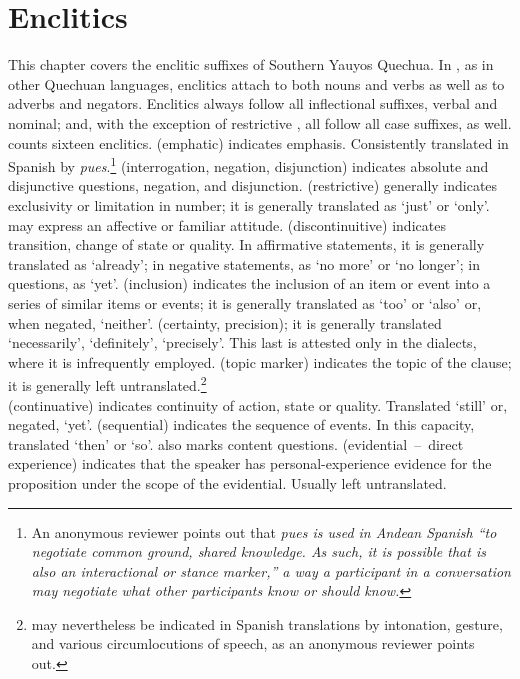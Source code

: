 \chapter{Enclitics}\label{ch:enclitics}
This chapter covers the enclitic suffixes of Southern Yauyos Quechua. In \SYQ, as in other Quechuan languages, enclitics attach to both nouns and verbs as well as to adverbs and negators. Enclitics always follow all inflectional suffixes, verbal and nominal; and, with the exception of restrictive , all follow all case suffixes, as well. \SYQ{} counts sixteen enclitics.  (emphatic) indicates emphasis. Consistently translated in Spanish by \textit{pues}.\footnote{An anonymous reviewer points out that \it{pues} is used in Andean Spanish “to negotiate common ground, shared knowledge. As such, it is possible that  is also an interactional or stance marker,” a way a participant in a conversation may negotiate what other participants know or should know.}  (interrogation, negation, disjunction) indicates absolute and disjunctive questions, negation, and disjunction.  (restrictive) generally indicates exclusivity or limitation in number; it is generally translated as ‘just’ or ‘only’.  may express an affective or familiar attitude.  (discontinuitive) indicates transition, change of state or quality. In affirmative statements, it is generally translated as ‘already’; in negative statements, as ‘no more’ or ‘no longer’; in questions, as ‘yet’.  (inclusion) indicates the inclusion of an item or event into a series of similar items or events; it is generally translated as ‘too’ or ‘also’ or, when negated, ‘neither’.  (certainty, precision); it is generally translated ‘necessarily’, ‘definitely’, ‘precisely’. This last is attested only in the \QII{} dialects, where it is infrequently employed.  (topic marker) indicates the topic of the clause; it is generally left untranslated.\footnote{ may nevertheless be indicated in Spanish translations by intonation, gesture, and various circumlocutions of speech, as an anonymous reviewer points out.}\\
 (continuative) indicates continuity of action, state or quality. Translated ‘still’ or, negated, ‘yet’.  (sequential) indicates the sequence of events. In this capacity, translated ‘then’ or ‘so’.  also marks content questions.  (evidential~--~direct experience) indicates that the speaker has personal-experience evidence for the proposition under the scope of the evidential. Usually left untranslated.\\
